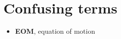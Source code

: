 \documentclass[hyperref, a4paper]{article}
\newcommand*{\concept}[1]{{\textbf{#1}}}
\begin{document}
\section{Confusing terms}

\begin{itemize}
    \item \concept{EOM}, equation of motion
\end{itemize}


 
\end{document}

